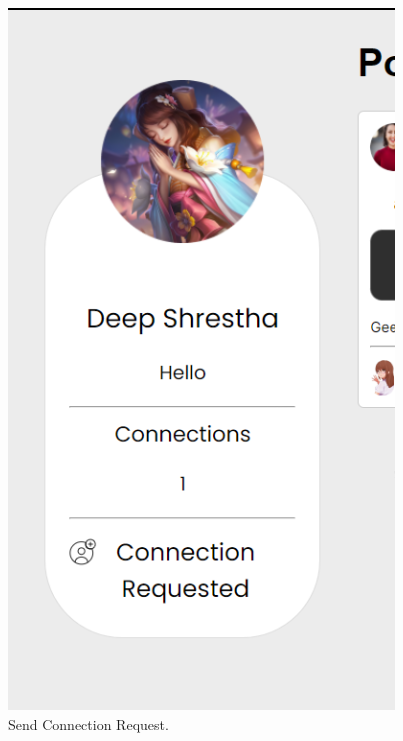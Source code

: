 \begin{figure}[ht]
    \centering
    \includegraphics[height=0.3\textheight]{Outcome-ss/connection-request.png}
    \caption{Send Connection Request.}
    \label{fig:Send Connection Request}
\end{figure}

